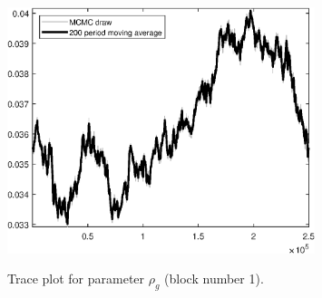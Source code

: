 \begin{figure}[H]
\centering
  \includegraphics[width=0.8\textwidth]{BRS_growth_ext_util/graphs/TracePlot_rho_g_blck_1}\\
    \caption{Trace plot for parameter ${\rho_g}$ (block number 1).}
\end{figure}
